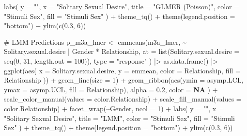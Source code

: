 \documentclass[
  bookmarksnumbered]{article}
\newenvironment{Shaded}{\begin{snugshade}}{\end{snugshade}}
\newcommand{\AttributeTok}[1]{\textcolor[rgb]{0.80,0.80,0.80}{#1}}
\newcommand{\CommentTok}[1]{\textcolor[rgb]{0.50,0.62,0.50}{#1}}
\newcommand{\ConstantTok}[1]{\textcolor[rgb]{0.86,0.64,0.64}{\textbf{#1}}}
\newcommand{\DecValTok}[1]{\textcolor[rgb]{0.86,0.86,0.80}{#1}}
\newcommand{\FloatTok}[1]{\textcolor[rgb]{0.75,0.75,0.82}{#1}}
\newcommand{\FunctionTok}[1]{\textcolor[rgb]{0.94,0.94,0.56}{#1}}
\newcommand{\NormalTok}[1]{\textcolor[rgb]{0.80,0.80,0.80}{#1}}
\newcommand{\OtherTok}[1]{\textcolor[rgb]{0.94,0.94,0.56}{#1}}
\newcommand{\SpecialCharTok}[1]{\textcolor[rgb]{0.86,0.64,0.64}{#1}}
\newcommand{\StringTok}[1]{\textcolor[rgb]{0.80,0.58,0.58}{#1}}
\begin{document}
\begin{Shaded}
\begin{Highlighting}[]
  \FunctionTok{labs}\NormalTok{(}
    \AttributeTok{y =} \StringTok{""}\NormalTok{, }\AttributeTok{x =} \StringTok{"Solitary Sexual Desire"}\NormalTok{,}
    \AttributeTok{title =} \StringTok{"GLMER (Poisson)"}\NormalTok{,}
    \AttributeTok{color =} \StringTok{"Stimuli Sex"}\NormalTok{, }\AttributeTok{fill =} \StringTok{"Stimuli Sex"}
\NormalTok{  ) }\SpecialCharTok{+}
  \FunctionTok{theme\_tq}\NormalTok{() }\SpecialCharTok{+}
  \FunctionTok{theme}\NormalTok{(}\AttributeTok{legend.position =} \StringTok{"bottom"}\NormalTok{) }\SpecialCharTok{+}
  \FunctionTok{ylim}\NormalTok{(}\FunctionTok{c}\NormalTok{(}\FloatTok{0.3}\NormalTok{, }\DecValTok{6}\NormalTok{))}

\CommentTok{\# LMM Predictions}
\NormalTok{p\_m3a\_lmer }\OtherTok{\textless{}{-}} \FunctionTok{emmeans}\NormalTok{(m3a\_lmer, }\SpecialCharTok{\textasciitilde{}}\NormalTok{ Solitary.sexual.desire }\SpecialCharTok{|}\NormalTok{ Gender }\SpecialCharTok{*}\NormalTok{ Relationship,}
  \AttributeTok{at =} \FunctionTok{list}\NormalTok{(}\AttributeTok{Solitary.sexual.desire =} \FunctionTok{seq}\NormalTok{(}\DecValTok{0}\NormalTok{, }\DecValTok{31}\NormalTok{, }\AttributeTok{length.out =} \DecValTok{100}\NormalTok{)),}
  \AttributeTok{type =} \StringTok{"response"}
\NormalTok{) }\SpecialCharTok{|\textgreater{}}
  \FunctionTok{as.data.frame}\NormalTok{() }\SpecialCharTok{|\textgreater{}}
  \FunctionTok{ggplot}\NormalTok{(}\FunctionTok{aes}\NormalTok{(}
    \AttributeTok{x =}\NormalTok{ Solitary.sexual.desire, }\AttributeTok{y =}\NormalTok{ emmean,}
    \AttributeTok{color =}\NormalTok{ Relationship, }\AttributeTok{fill =}\NormalTok{ Relationship}
\NormalTok{  )) }\SpecialCharTok{+}
  \FunctionTok{geom\_line}\NormalTok{(}\AttributeTok{size =} \DecValTok{1}\NormalTok{) }\SpecialCharTok{+}
  \FunctionTok{geom\_ribbon}\NormalTok{(}\FunctionTok{aes}\NormalTok{(}\AttributeTok{ymin =}\NormalTok{ asymp.LCL, }\AttributeTok{ymax =}\NormalTok{ asymp.UCL, }\AttributeTok{fill =}\NormalTok{ Relationship),}
    \AttributeTok{alpha =} \FloatTok{0.2}\NormalTok{, }\AttributeTok{color =} \ConstantTok{NA}
\NormalTok{  ) }\SpecialCharTok{+}
  \FunctionTok{scale\_color\_manual}\NormalTok{(}\AttributeTok{values =}\NormalTok{ color.Relationship) }\SpecialCharTok{+}
  \FunctionTok{scale\_fill\_manual}\NormalTok{(}\AttributeTok{values =}\NormalTok{ color.Relationship) }\SpecialCharTok{+}
  \FunctionTok{facet\_wrap}\NormalTok{(}\SpecialCharTok{\textasciitilde{}}\NormalTok{Gender, }\AttributeTok{ncol =} \DecValTok{1}\NormalTok{) }\SpecialCharTok{+}
  \FunctionTok{labs}\NormalTok{(}
    \AttributeTok{y =} \StringTok{""}\NormalTok{, }\AttributeTok{x =} \StringTok{"Solitary Sexual Desire"}\NormalTok{,}
    \AttributeTok{title =} \StringTok{"LMM"}\NormalTok{,}
    \AttributeTok{color =} \StringTok{"Stimuli Sex"}\NormalTok{, }\AttributeTok{fill =} \StringTok{"Stimuli Sex"}
\NormalTok{  ) }\SpecialCharTok{+}
  \FunctionTok{theme\_tq}\NormalTok{() }\SpecialCharTok{+}
  \FunctionTok{theme}\NormalTok{(}\AttributeTok{legend.position =} \StringTok{"bottom"}\NormalTok{) }\SpecialCharTok{+}
  \FunctionTok{ylim}\NormalTok{(}\FunctionTok{c}\NormalTok{(}\FloatTok{0.3}\NormalTok{, }\DecValTok{6}\NormalTok{))}


\end{Highlighting}
\end{Shaded}
\end{document}

